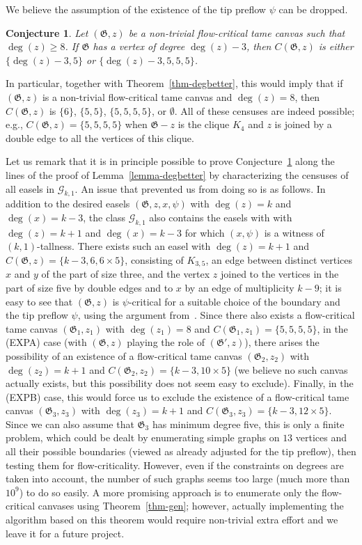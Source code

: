 \documentclass{article}
\newcommand{\GG}{\mathcal{G}}
\newcommand\g{\mathfrak{G}}
\newtheorem{conjecture}[theorem]{Conjecture}
\begin{document}
We believe the assumption of the existence of the tip preflow $\psi$ can be dropped.
\begin{conjecture}\label{conj-db3}
Let $(\g,z)$ be a non-trivial flow-critical tame canvas such that $\deg(z)\ge 8$.
If $\g$ has a vertex of degree $\deg(z)-3$, then $C(\g,z)$ is either $\{\deg(z)-3,5\}$ or $\{\deg(z)-3,5,5,5\}$.
\end{conjecture}
In particular, together with Theorem~\ref{thm-degbetter}, this would imply that
if $(\g,z)$ is a non-trivial flow-critical tame canvas and $\deg(z)=8$,
then $C(\g,z)$ is $\{6\}$, $\{5,5\}$, $\{5,5,5,5\}$, or $\emptyset$.
All of these censuses are indeed possible; e.g., $C(\g,z)=\{5,5,5,5\}$
when $\g-z$ is the clique $K_4$ and $z$ is joined by a double edge to all the vertices of this clique.

Let us remark that it is in principle possible to prove Conjecture~\ref{conj-db3} along the lines
of the proof of Lemma~\ref{lemma-degbetter} by characterizing the censuses of all easels in $\GG_{k,1}$.
An issue that prevented us from doing so is as follows.  In addition to the desired easels $(\g,z,x,\psi)$
with $\deg(z)=k$ and $\deg(x)=k-3$, the class $\GG_{k,1}$ also contains the easels with
with $\deg(z)=k+1$ and $\deg(x)=k-3$ for which $(x,\psi)$ is a witness of $(k,1)$-tallness.
There exists such an easel with $\deg(z)=k+1$ and $C(\g,z)=\{k-3, 6, 6\times 5\}$, consisting of $K_{3,5}$,
an edge between distinct vertices $x$ and $y$ of the part of size three, and the vertex $z$ joined to the vertices
in the part of size five by double edges and to $x$ by an edge of multiplicity $k-9$; it is easy to see that
$(\g,z)$ is $\psi$-critical for a suitable choice of the boundary and the tip preflow $\psi$, using the argument from~\cite{li20223}.
Since there also exists a flow-critical tame canvas $(\g_1,z_1)$ with $\deg(z_1)=8$ and $C(\g_1,z_1)=\{5,5,5,5\}$,
in the (EXPA) case (with $(\g,z)$ playing the role of $(\g',z)$),
there arises the possibility of an existence of a flow-critical tame canvas $(\g_2,z_2)$
with $\deg(z_2)=k+1$ and $C(\g_2,z_2)=\{k-3, 10\times 5\}$ (we believe no such canvas actually exists, but
this possibility does not seem easy to exclude).  Finally, in the (EXPB) case, this
would force us to exclude the existence of a flow-critical tame canvas $(\g_3,z_3)$
with $\deg(z_3)=k+1$ and $C(\g_3,z_3)=\{k-3, 12\times 5\}$.  Since we can also assume that $\g_3$
has minimum degree five, this is only a finite problem, which could be dealt by enumerating
simple graphs on $13$ vertices and all their possible boundaries (viewed as already adjusted for
the tip preflow), then testing them for flow-criticality.  However, even if the constraints on
degrees are taken into account, the number of such graphs seems too large (much more than $10^9$)
to do so easily.  A more promising approach is to enumerate only the flow-critical canvases using Theorem~\ref{thm-gen};
however, actually implementing the algorithm based on this theorem would require non-trivial extra effort
and we leave it for a future project.
\end{document}
